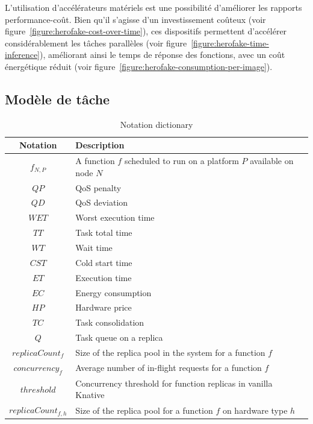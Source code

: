 L'utilisation d'accélérateurs matériels est une possibilité d'améliorer les rapports performance-coût. Bien qu'il s'agisse d'un investissement coûteux (voir figure~\ref{figure:herofake-cost-over-time}), ces dispositifs permettent d'accélérer considérablement les tâches parallèles (voir figure~\ref{figure:herofake-time-inference}), améliorant ainsi le temps de réponse des fonctions, avec un coût énergétique réduit (voir figure~\ref{figure:herofake-consumption-per-image}).

\subsection{Modèle de tâche} \label{model:tasks}

\begin{table}[t]
    \caption{Notation dictionary}
    \begin{center}
    \begin{tabular}{|c|L|}
    \hline
    \textbf{Notation} & \textbf{Description} \\ \hline
    $f_{N, P}$ & A function $f$ scheduled to run on a platform $P$ available on node $N$ \\ \hline
    $QP$ & QoS penalty \\ \hline
    $QD$ & QoS deviation \\ \hline
    $WET$ & Worst execution time \\ \hline
    $TT$ & Task total time \\ \hline
    $WT$ & Wait time \\ \hline
    $CST$ & Cold start time \\ \hline
    $ET$ & Execution time \\ \hline
    $EC$ & Energy consumption \\ \hline
    $HP$ & Hardware price \\ \hline
    $TC$ & Task consolidation \\ \hline
    $Q$ & Task queue on a replica \\ \hline
    $replicaCount_{f}$ & Size of the replica pool in the system for a function $f$ \\ \hline
    $concurrency_{f}$ & Average number of in-flight requests for a function $f$ \\ \hline
    $threshold$ & Concurrency threshold for function replicas in vanilla Knative \\ \hline
    $replicaCount_{f, h}$ & Size of the replica pool for a function $f$ on hardware type $h$ \\ \hline

\end{tabular}
\end{center}
\end{table}
